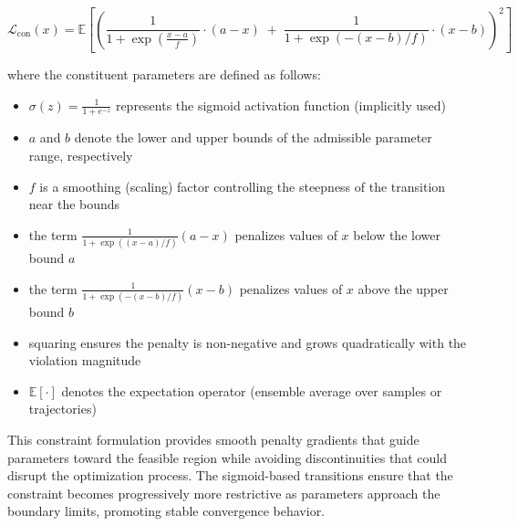 \documentclass[11pt, oneside]{article}
\begin{document}

\begin{equation}
    \mathcal{L_{\mathrm{con}}}(x) = \mathbb{E}\left[\left(
        \frac{1}{1 + \exp\!\left(\tfrac{x-a}{f}\right)} \cdot (a-x) \;+\;
        \frac{1}{1 + \exp\!\left(-(x-b)/f\right)} \cdot (x-b)
        \right)^{2}\right]
\end{equation}

where the constituent parameters are defined as follows:
\begin{itemize}
    \item $\sigma(z) = \tfrac{1}{1+e^{-z}}$ represents the sigmoid activation function (implicitly used)
    \item $a$ and $b$ denote the lower and upper bounds of the admissible parameter range, respectively
    \item $f$ is a smoothing (scaling) factor controlling the steepness of the transition near the bounds
    \item the term $\tfrac{1}{1+\exp((x-a)/f)}(a-x)$ penalizes values of $x$ below the lower bound $a$
    \item the term $\tfrac{1}{1+\exp(-(x-b)/f)}(x-b)$ penalizes values of $x$ above the upper bound $b$
    \item squaring ensures the penalty is non-negative and grows quadratically with the violation magnitude
    \item $\mathbb{E}[\cdot]$ denotes the expectation operator (ensemble average over samples or trajectories)
\end{itemize}


This constraint formulation provides smooth penalty gradients that guide parameters toward the feasible region while avoiding discontinuities that could disrupt the optimization process. The sigmoid-based transitions ensure that the constraint becomes progressively more restrictive as parameters approach the boundary limits, promoting stable convergence behavior.
\end{document}
